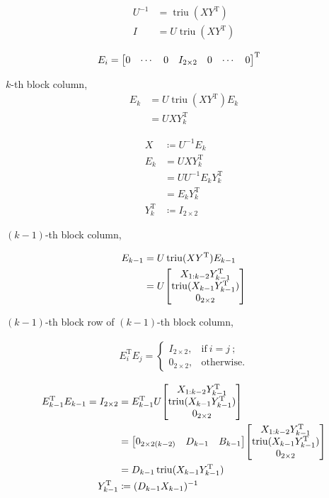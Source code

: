\documentclass[11pt]{article}
\newcommand{\triu}{\mathop{\mathrm{triu}}}
\newcommand{\T}{\mathrm{T}}
\begin{document}
\begin{align*}
    U^{-1} &= \triu(XY^{\T}) \\
    I &= U \triu(XY^{\T})
\end{align*}

\begin{align*}
    E_{i} &= \mqty[0 & \cdots & 0 & I_{2 \times 2} & 0 & \cdots & 0]^{\T}
\end{align*}




$k$-th block column, 
\begin{align*}
    E_{k} &= U \triu(XY^{\T})E_{k} \\
    &= U X Y_{k}^{\T}
\end{align*}


\begin{align*}
    X &\coloneqq U^{-1} E_{k} \\
    E_{k} &= U X Y_{k}^{\T} \\
        &= U U^{-1} E_{k} Y_{k}^{\T} \\
        &= E_{k} Y_{k}^{\T} \\
    Y_{k}^{\T} &\coloneqq I_{2 \times 2}
\end{align*}


$(k-1)$-th block column, 

\begin{align*}
    E_{k-1} &= U \triu(XY^{\T})E_{k-1} \\
    &= U \mqty[
        X_{1:k-2}Y_{k-1}^{\T} \\
        \triu(X_{k-1}Y_{k-1}^{\T}) \\
        0_{2 \times 2}
        ]
\end{align*}

$(k-1)$-th block row of $(k-1)$-th block column, 

\begin{align*}
    E_{i}^{\T} E_{j} = 
    \begin{cases}
        I_{2 \times 2}, & \text{if} \ i=j \ ;\\
        0_{2 \times 2}, & \text{otherwise}.
    \end{cases} 
\end{align*}

\begin{align*}
    E_{k-1}^{\T} E_{k-1} = I_{2 \times 2} &= E_{k-1}^{\T} U \mqty[
        X_{1:k-2}Y_{k-1}^{\T} \\
        \triu(X_{k-1}Y_{k-1}^{\T}) \\
        0_{2 \times 2}
        ] \\
        &= \mqty[
            0_{2 \times 2(k-2)} & D_{k-1} & B_{k-1}
        ] \mqty[
            X_{1:k-2}Y_{k-1}^{\T} \\
            \triu(X_{k-1}Y_{k-1}^{\T}) \\
            0_{2 \times 2}
            ] \\
        & = D_{k-1} \triu(X_{k-1}Y_{k-1}^{\T}) \\
    Y_{k-1}^{\T} &\coloneqq (D_{k-1} X_{k-1})^{-1}
\end{align*}
\end{document}
